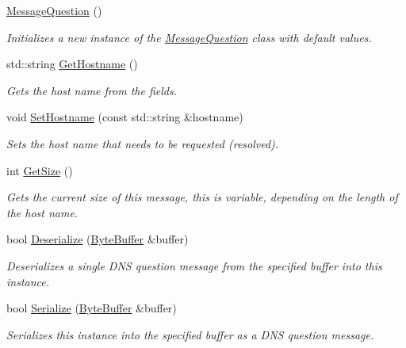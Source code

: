 \begin{DoxyCompactItemize}
\item 
\hyperlink{class_senergy_1_1_dns_1_1_message_question_a956458fba0c9b96fbd78408250095148}{Message\-Question} ()
\begin{DoxyCompactList}\small\item\em Initializes a new instance of the \hyperlink{class_senergy_1_1_dns_1_1_message_question}{Message\-Question} class with default values. \end{DoxyCompactList}\item 
std\-::string \hyperlink{class_senergy_1_1_dns_1_1_message_question_a5fa467b516be4914f865bc5d053e98be}{Get\-Hostname} ()
\begin{DoxyCompactList}\small\item\em Gets the host name from the fields. \end{DoxyCompactList}\item 
void \hyperlink{class_senergy_1_1_dns_1_1_message_question_a239d21d940aa38b8d953ff29b400b9cf}{Set\-Hostname} (const std\-::string \&hostname)
\begin{DoxyCompactList}\small\item\em Sets the host name that needs to be requested (resolved). \end{DoxyCompactList}\item 
int \hyperlink{class_senergy_1_1_dns_1_1_message_question_a0a007a1d002a37189ce0f8c943335216}{Get\-Size} ()
\begin{DoxyCompactList}\small\item\em Gets the current size of this message, this is variable, depending on the length of the host name. \end{DoxyCompactList}\item 
bool \hyperlink{class_senergy_1_1_dns_1_1_message_question_a1c66b45b448f262a4f2cf1317c89b5b3}{Deserialize} (\hyperlink{class_senergy_1_1_byte_buffer}{Byte\-Buffer} \&buffer)
\begin{DoxyCompactList}\small\item\em Deserializes a single D\-N\-S question message from the specified buffer into this instance. \end{DoxyCompactList}\item 
bool \hyperlink{class_senergy_1_1_dns_1_1_message_question_a60772687d382e1d376852e1b5ff59968}{Serialize} (\hyperlink{class_senergy_1_1_byte_buffer}{Byte\-Buffer} \&buffer)
\begin{DoxyCompactList}\small\item\em Serializes this instance into the specified buffer as a D\-N\-S question message. \end{DoxyCompactList}\item 

\end{DoxyCompactItemize}
